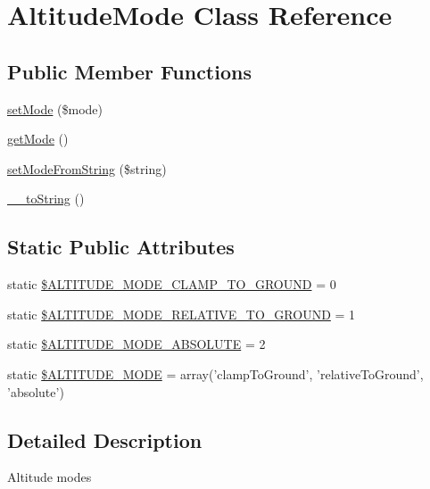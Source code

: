 \hypertarget{classAltitudeMode}{
\section{AltitudeMode Class Reference}
\label{de/da2/classAltitudeMode}
}
\subsection*{Public Member Functions}
\begin{DoxyCompactItemize}
\item 
\hyperlink{classAltitudeMode_acd0800efb348d7c68995a8c5ad0e5e13}{setMode} (\$mode)
\item 
\hyperlink{classAltitudeMode_a30e0f6e72275abba31a7060caf149ee5}{getMode} ()
\item 
\hyperlink{classAltitudeMode_a966d777556e5f1f40ad991dda0d555d5}{setModeFromString} (\$string)
\item 
\hyperlink{classAltitudeMode_a7bfa28126bf8cdcc97075fe46d2fe2fa}{\_\-\_\-toString} ()
\end{DoxyCompactItemize}
\subsection*{Static Public Attributes}
\begin{DoxyCompactItemize}
\item 
static \hyperlink{classAltitudeMode_a4a763be1a8e1087ff82f9c517f480f67}{\$ALTITUDE\_\-MODE\_\-CLAMP\_\-TO\_\-GROUND} = 0
\item 
static \hyperlink{classAltitudeMode_ac76fe66f1ae2d6fc3490cfdccba2b81d}{\$ALTITUDE\_\-MODE\_\-RELATIVE\_\-TO\_\-GROUND} = 1
\item 
static \hyperlink{classAltitudeMode_ab6a66434b3d8ee7da69c04196e12ec5c}{\$ALTITUDE\_\-MODE\_\-ABSOLUTE} = 2
\item 
static \hyperlink{classAltitudeMode_a29c5122f255fb163e5b1335a61dc47b5}{\$ALTITUDE\_\-MODE} = array('clampToGround', 'relativeToGround', 'absolute')
\end{DoxyCompactItemize}


\subsection{Detailed Description}
Altitude modes 

